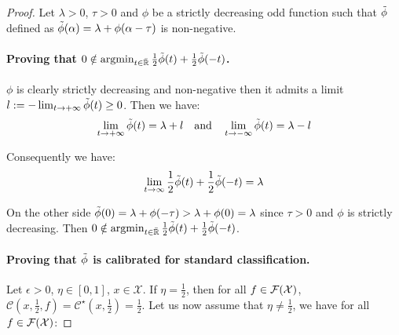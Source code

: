 \begin{proof}
    Let $\lambda>0$, $\tau>0$ and $\phi$ be a strictly decreasing odd function such that $\Tilde{\phi}$ defined as  $\Tilde{\phi}(\alpha) = \lambda +\phi(\alpha-\tau)$ is non-negative. 
    
    \paragraph{Proving that $0\notin\operatorname*{argmin}_{t\in\bar{\mathbb{R}}}\frac12\Tilde{\phi}(t)+\frac12 \Tilde{\phi}(-t)$.}${\phi}$ is clearly strictly decreasing and non-negative then it admits a limit $l:=-\lim_{t\to+\infty}\Tilde{\phi}(t)\geq0$. Then we have:
    \begin{align*}
        \lim_{t\to+\infty}\Tilde{\phi}(t) = \lambda+l\quad\text{and}\quad\lim_{t\to-\infty}\Tilde{\phi}(t) = \lambda-l
    \end{align*}
    
    Consequently we have:
    \begin{align*}
        \lim_{t\to\infty}\frac12\Tilde{\phi}(t)+\frac12 \Tilde{\phi}(-t)= \lambda
    \end{align*}
    
    On the other side $\Tilde{\phi}(0)= \lambda + \phi(-\tau) >\lambda +\phi(0) =\lambda$ since $\tau>0$ and $\phi$ is strictly decreasing. Then $0\notin \operatorname*{argmin}_{t\in\bar{\mathbb{R}}}\frac12\Tilde{\phi}(t)+\frac12 \Tilde{\phi}(-t)$.
    
    
    \paragraph{Proving that $\Tilde{\phi}$ is calibrated for standard classification.} Let $\epsilon>0$, $\eta\in[0,1]$, $x\in\mathcal{X}$. If $\eta=\frac12$, then for all $f\in\mathcal{F}(\mathcal{X})$, $\mathcal{C}(x,\frac12,f)= \mathcal{C}^\star(x,\frac12)=\frac12$. Let us now assume that $\eta\neq\frac12$, we have for all $f\in\mathcal{F}(\mathcal{X})$:
    

\end{proof}
